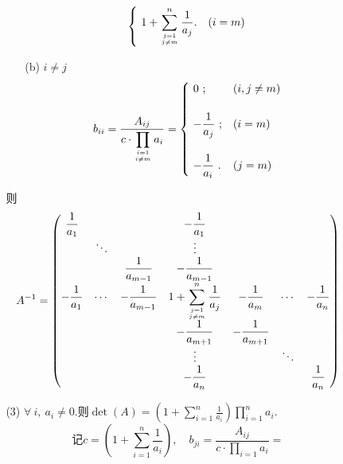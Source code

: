 \documentclass{article}
\begin{document}
\begin{enumerate}
\begin{enumerate}
\begin{enumerate}
\begin{enumerate}
\[\begin{cases}
                        \ \displaystyle{1+\sum\limits_{j=1 \atop j\neq m}^n \frac{1}{a_j}}. & (i=m)
                    \end{cases}
                \]
                \item [(b)]$i\neq j$
                \[
                    b_{ii}=\frac{A_{ij}}{c\cdot \displaystyle{\prod\limits_{i=1 \atop i\neq m} a_i}}=
                    \begin{cases}
                        \ 0\ ; & (i,j\neq m)\\
                        &\\
                        \ -\displaystyle{\frac{1}{a_j}}\ ; & (i=m)\\
                        &\\
                        \ -\displaystyle{\frac{1}{a_i}}\ . & (j=m)
                    \end{cases}
                \]
            \end{enumerate}
            则
            \[
                A^{-1}=
                \begin{pmatrix}
                    \displaystyle{\frac{1}{a_1}} & & & -\displaystyle{\frac{1}{a_1}} & & & \\
                     & \ddots & & \vdots & & & \\
                     & & \displaystyle{\frac{1}{a_{m-1}}} & -\displaystyle{\frac{1}{a_{m-1}}} & & & \\
                     -\displaystyle{\frac{1}{a_1}} & \cdots & -\displaystyle{\frac{1}{a_{m-1}}} & 
                     \displaystyle{1+\sum\limits_{j=1 \atop j\neq m}^n \frac{1}{a_j}} & -\displaystyle{\frac{1}{a_m}} & \cdots & -\displaystyle{\frac{1}{a_n}} \\
                     & & & -\displaystyle{\frac{1}{a_{m+1}}} & -\displaystyle{\frac{1}{a_{m+1}}} & & \\
                     & & & \vdots & & \ddots & \\
                     & & & -\displaystyle{\frac{1}{a_n}} & & & \displaystyle{\frac{1}{a_n}}
                \end{pmatrix}
            \]
            \item [(3)]$\forall\ i,\ a_i\neq 0$.则$\det(A)=\displaystyle{\left(1+\sum\limits_{i=1}^n \frac{1}{a_i} \right)\prod\limits_{i=1}^n a_i }$.
            \[
                \mbox{记}c=\displaystyle{\left(1+\sum\limits_{i=1}^n \frac{1}{a_i} \right)},\quad
                b_{ji}=\frac{A_{ij}}{c\cdot \displaystyle{\prod\limits_{i=1} a_i}}=
\]
\end{enumerate}
\end{enumerate}
\end{enumerate}
\end{document}
